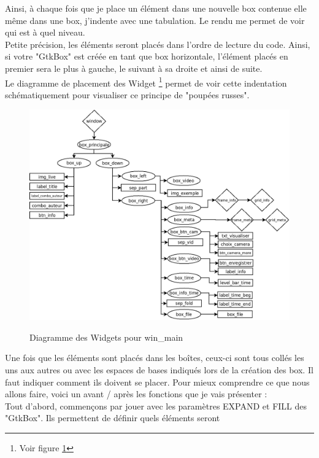 \documentclass[11pt,french,a4paper]{report}
\begin{document}
Ainsi, à chaque fois que je place un élément dans une nouvelle box contenue elle même dans une box, j'indente avec une 
tabulation. Le rendu me permet de voir qui est à quel niveau. \\
Petite précision, les éléments seront placés dans l'ordre de lecture du code. Ainsi, si votre "GtkBox" est créée en tant
que box horizontale, l'élément placés en premier sera le plus à gauche, le suivant à sa droite et ainsi de suite. \\ 
Le diagramme de placement des Widget \footnote{Voir figure \ref{org_win_main}} permet de voir cette 
indentation schématiquement pour visualiser ce principe de "poupées russes".
\begin{figure}[!h]
\centering
\includegraphics[scale=0.5]{../images/dia/diagramme_fenetre.png} \\
        \caption{Diagramme des Widgets pour win\_main}
        \label{org_win_main}
\end{figure}
Une fois que les éléments sont placés dans les boîtes, ceux-ci sont tous collés les uns aux autres ou avec 
les espaces de bases indiqués lors de la création des box. %
Il faut indiquer comment ils doivent se placer. Pour mieux comprendre ce que nous allons faire, voici un 
avant / après les fonctions que je vais présenter : \\ 
Tout d'abord, commençons par jouer avec les paramètres EXPAND et FILL des "GtkBox". Ils permettent de définir quels éléments seront 
\end{document}
